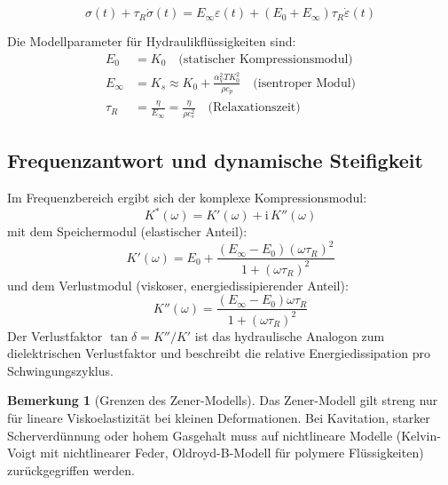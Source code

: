 ﻿\documentclass[a4paper,12pt]{scrreprt}
\theoremstyle{definition}
\newtheorem{bemerkung}{Bemerkung}[section]
\begin{document}
\begin{equation}
  \sigma(t) + \tau_R \dot{\sigma}(t)
    = E_\infty \varepsilon(t)
    + (E_0 + E_\infty) \tau_R \dot{\varepsilon}(t)
  \label{eq:zener_hydraulik}
\end{equation}

Die Modellparameter für Hydraulikflüssigkeiten sind:
\begin{align}
  E_0 &= K_0 \quad \text{(statischer Kompressionsmodul)} \label{eq:e0} \\
  E_\infty &= K_s \approx K_0 + \frac{\alpha_V^2 T K_0^2}{\rho c_p}
    \quad \text{(isentroper Modul)} \label{eq:einf} \\
  \tau_R &= \frac{\eta}{E_\infty} = \frac{\eta}{\rho c_s^2}
    \quad \text{(Relaxationszeit)} \label{eq:tau_r}
\end{align}

\subsection{Frequenzantwort und dynamische Steifigkeit}

Im Frequenzbereich ergibt sich der komplexe Kompressionsmodul:
\begin{equation}
  K^*(\omega) = K'(\omega) + \mathrm{i} \, K''(\omega)
  \label{eq:kompl_modul}
\end{equation}
mit dem Speichermodul (elastischer Anteil):
\begin{equation}
  K'(\omega) = E_0 + \frac{(E_\infty - E_0) (\omega \tau_R)^2}{1 + (\omega \tau_R)^2}
  \label{eq:speichermodul}
\end{equation}
und dem Verlustmodul (viskoser, energiedissipierender Anteil):
\begin{equation}
  K''(\omega) = \frac{(E_\infty - E_0) \omega \tau_R}{1 + (\omega \tau_R)^2}
  \label{eq:verlustmodul}
\end{equation}
Der Verlustfaktor $\tan\delta = K'' / K'$ ist das hydraulische Analogon
zum dielektrischen Verlustfaktor und beschreibt die relative Energiedissipation
pro Schwingungszyklus.

\begin{bemerkung}[Grenzen des Zener-Modells]
  Das Zener-Modell gilt streng nur für lineare Viskoelastizität bei kleinen
  Deformationen. Bei Kavitation, starker Scherverdünnung oder hohem Gasgehalt
  muss auf nichtlineare Modelle (Kelvin-Voigt mit nichtlinearer Feder,
  Oldroyd-B-Modell für polymere Flüssigkeiten) zurückgegriffen werden.
\end{bemerkung}
\end{document}
